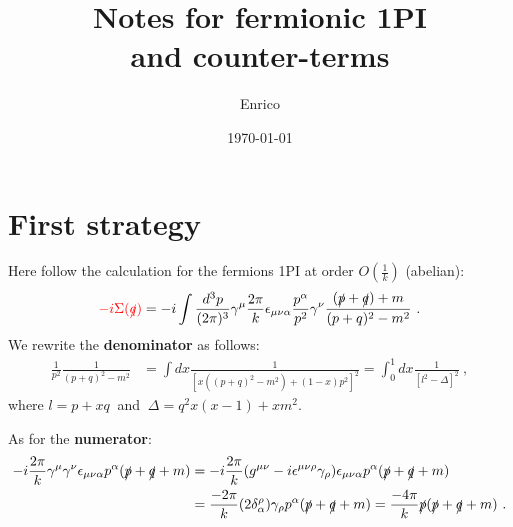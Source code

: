 \documentclass[a4paper,11pt,DIV=12]{scrartcl}
\begin{document}
\title{Notes for fermionic 1PI\\ and counter-terms}
\author{Enrico}
\date{\today}  %

\maketitle

\section{First strategy}

Here follow the calculation for the fermions 1PI at order $O(\frac{1}{k})$ (abelian):
\begin{equation}
    \textcolor{red}{-i\Sigma(\slashed{q})}=-i \int \frac{d^3 p}{(2\pi)^3}\gamma^\mu \frac{2\pi}{k} \epsilon_{\mu \nu \alpha} \frac{p^\alpha}{p^2}\gamma^\nu \frac{(\slashed{p}+\slashed{q})+m}{(p+q)^2-m^2}\ .
\end{equation}
We rewrite the \textbf{denominator} as follows:
\begin{align*}
    \frac{1}{p^2}\frac{1}{(p+q)^2-m^2}&= \int dx \frac{1}{[x((p+q)^2-m^2)+(1-x)p^2]^2}=\int_0^1 dx\frac{1}{[l^2-\Delta]^2}\ ,
\end{align*}
where $l = p +x q\ $ and $\ \Delta = q^2 x(x-1)+x m^2$.

As for the \textbf{numerator}:
\begin{align*}
    -i\frac{2\pi}{k} \gamma^\mu \gamma^\nu \epsilon_{\mu \nu \alpha}p^\alpha (\slashed{p}+\slashed{q}+m)&=-i \frac{2\pi}{k}(g^{\mu \nu}-i\epsilon^{\mu \nu \rho}\gamma_\rho)\epsilon_{\mu \nu \alpha}p^\alpha(\slashed{p}+\slashed{q}+m) 
    \\ &= \frac{-2\pi}{k}(2\delta^\rho_\alpha) \gamma_\rho p^\alpha (\slashed{p}+\slashed{q}+m) =\frac{-4\pi}{k}\slashed{p}(\slashed{p}+\slashed{q}+m)\ .
\end{align*}
\end{document}
